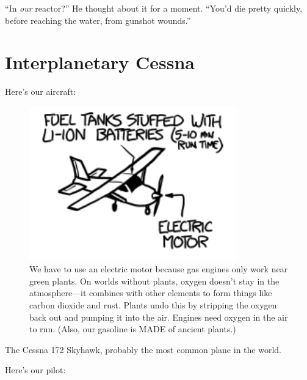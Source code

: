 {“In \emph{our} reactor?” He thought about it for a moment. “You’d die pretty quickly, before reaching the water, from gunshot wounds.”}

{
\chapter{Interplanetary Cessna}
}

\hfill{}

{Here’s our aircraft:}

\begin{figure}[!htbp]
\centering
\includegraphics[scale=0.5, max width=0.8\textwidth]{imgs/a/30/cessna_plane.png}
\caption{We have to use an electric motor because gas engines only work near green plants. On worlds without plants, oxygen doesn’t stay in the atmosphere—it combines with other elements to form things like carbon dioxide and rust. Plants undo this by stripping the oxygen back out and pumping it into the air. Engines need oxygen in the air to run. (Also, our gasoline is MADE of ancient plants.)}
\end{figure}

{The Cessna 172 Skyhawk, probably the most common plane in the world.}

{Here’s our pilot:}

